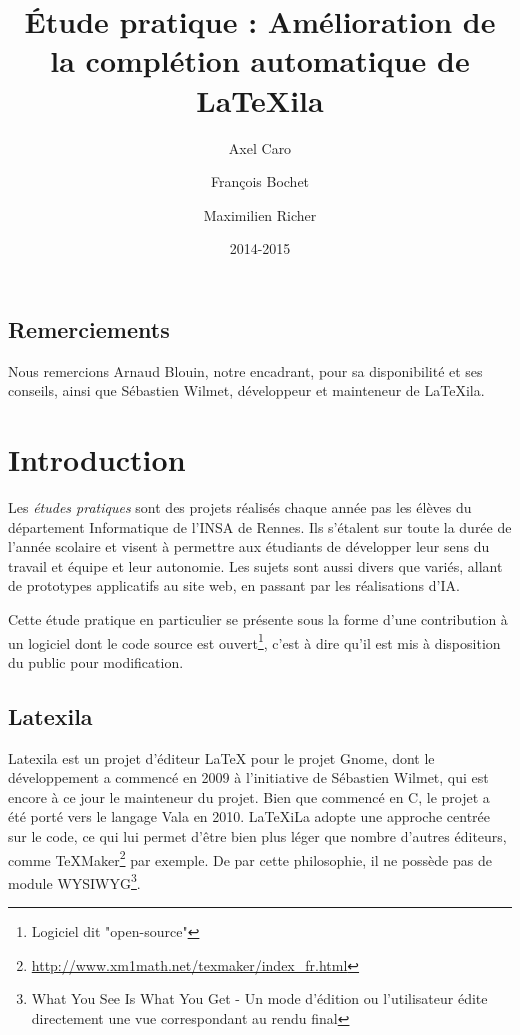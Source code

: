 \documentclass[a4paper,11pt]{report}
\title{Étude pratique : Amélioration de la complétion automatique de \LaTeX{}ila}
\author{Axel Caro\and François Bochet\and Maximilien Richer}
\date{2014-2015}
\begin{document}


\maketitle %
\tableofcontents %

\section{Remerciements} %
\label{sec:remerciements}
Nous remercions Arnaud Blouin, notre encadrant, pour sa disponibilité et ses conseils, ainsi que Sébastien Wilmet, développeur et mainteneur de LaTeXila.

\chapter{Introduction}
\label{cha:Introduction}
Les \textit{études pratiques} sont des projets réalisés chaque année pas les élèves du département Informatique de l'INSA de Rennes. Ils s'étalent sur toute la durée de l'année scolaire et visent à permettre aux étudiants de développer leur sens du travail et équipe et leur autonomie. Les sujets sont aussi divers que variés, allant de prototypes applicatifs au site web, en passant par les réalisations d'IA.

Cette étude pratique en particulier se présente sous la forme d'une contribution à un logiciel dont le code source est ouvert\footnote{Logiciel dit "open-source"}, c'est à dire qu'il est mis à disposition du public pour modification.

\section{Latexila}
\label{sec:latexila}
Latexila est un projet d'éditeur LaTeX pour le projet Gnome, dont le développement a commencé en 2009 à l'initiative de Sébastien Wilmet, qui est encore à ce jour le mainteneur du projet. Bien que commencé en C, le projet a été porté vers le langage Vala en 2010. LaTeXiLa adopte une approche centrée sur le code, ce qui lui permet d'être bien plus léger que nombre d'autres éditeurs, comme TeXMaker\footnote{\url{http://www.xm1math.net/texmaker/index_fr.html}} par exemple. De par cette philosophie, il ne possède pas de module WYSIWYG\footnote{What You See Is What You Get - Un mode d'édition ou l'utilisateur édite directement une vue correspondant au rendu final}.
\end{document}
